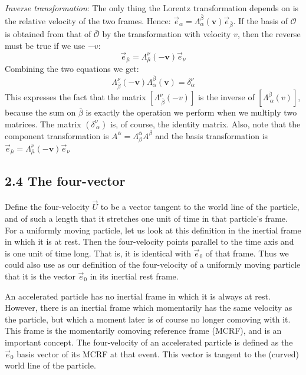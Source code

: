 \documentclass[12pt]{book}
\begin{document}
        \textit{Inverse transformation}: The only thing the Lorentz transformation depends on is the relative velocity of the two frames. Hence: \(    \vec{e}_\alpha=\Lambda^{\bar{\beta}}_\alpha(\bm{v}) \vec{e}_{\bar{\beta}}\). If the basis of \(\mathcal{O}\) is obtained from that of \(\mathcal{\bar{O}}\) by the transformation with velocity \(v\), then the reverse must be true if we use \(-v\):
        \[
            \vec{e}_\bar{\mu}=\Lambda^{\nu}_\bar{\mu}(\bm{-v}) \vec{e}_{\nu}
        \]
        Combining the two equations we get:
        \[
            \Lambda^{\nu}_\bar{\beta} (\bm{-v}) \Lambda^{\bar{\beta}}_\alpha (\bm{v}) = \delta^\nu_\alpha
        \]
        This expresses the fact that the matrix \([\Lambda^\nu_{\ \bar{\beta}}(-v)]\) is the inverse of \([\Lambda^{\bar{\beta}}_{\ \alpha}(v)]\), because the sum on \(\bar{\beta}\) is exactly the operation we perform when we multiply two matrices. The matrix \((\delta^\nu_{\ \alpha})\) is, of course, the identity matrix. Also, note that the component transformation is \(A^{\bar{\alpha}}=\Lambda^{\bar{\alpha}}_\beta A^\beta\) and the basis transformation is \(\vec{e}_\bar{\mu}=\Lambda^{\nu}_\bar{\mu}(\bm{-v}) \vec{e}_{\nu}\)

    \subsection{2.4 The four-vector}

        Define the four-velocity \( \vec{U} \) to be a vector tangent to the world line of the particle, and of such a length that it stretches one unit of time in that particle’s frame. For a uniformly moving particle, let us look at this definition in the inertial frame in which it is at rest. Then the four-velocity points parallel to the time axis and is one unit of time long. That is, it is identical with \( \vec{e}_0 \) of that frame. Thus we could also use as our definition of the four-velocity of a uniformly moving particle that it is the vector \( \vec{e}_0 \) in its inertial rest frame.

        An accelerated particle has no inertial frame in which it is always at rest. However, there is an inertial frame which momentarily has the same velocity as the particle, but which a moment later is of course no longer comoving with it. This frame is the momentarily comoving reference frame (MCRF), and is an important concept. The four-velocity of an accelerated particle is defined as the \( \vec{e}_0 \) basis vector of its MCRF at that event. This vector is tangent to the (curved) world line of the particle.
\end{document}

